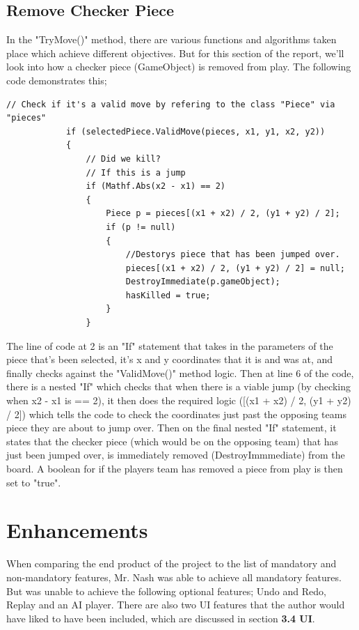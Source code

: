 \documentclass[10pt, a4paper]{article}
\begin{document}
	 \subsection{Remove Checker Piece}
	 In the "TryMove()" method, there are various functions and algorithms taken place which achieve different objectives. But for this section of the report, we'll look into how a checker piece (GameObject) is removed from play. The following code demonstrates this;
	 \begin{lstlisting}[caption = TryMove()]
	 // Check if it's a valid move by refering to the class "Piece" via "pieces"
            if (selectedPiece.ValidMove(pieces, x1, y1, x2, y2))
            {
                // Did we kill?
                // If this is a jump
                if (Mathf.Abs(x2 - x1) == 2)
                {
                    Piece p = pieces[(x1 + x2) / 2, (y1 + y2) / 2];
                    if (p != null)
                    {
                        //Destorys piece that has been jumped over.
                        pieces[(x1 + x2) / 2, (y1 + y2) / 2] = null;
                        DestroyImmediate(p.gameObject);
                        hasKilled = true;
                    }
                }
	 \end{lstlisting}
	 The line of code at 2 is an "If" statement that takes in the parameters of the piece that's been selected, it's x and y coordinates that it is and was at, and finally checks against the "ValidMove()" method logic. Then at line 6 of the code, there is a nested "If" which checks that when there is a viable jump (by checking when x2 - x1 is == 2), it then does the required logic ([(x1 + x2) / 2, (y1 + y2) / 2]) which tells the code to check the coordinates just past the opposing teams piece they are about to jump over. Then on the final nested "If" statement, it states that the checker piece (which would be on the opposing team) that has just been jumped over, is immediately removed (DestroyImmmediate) from the board. A boolean for if the players team has removed a piece from play is then set to "true".
	 
	 \section{Enhancements}
	 When comparing the end product of the project to the list of mandatory and non-mandatory features, Mr. Nash was able to achieve all mandatory features. But was unable to achieve the following optional features; Undo and Redo, Replay and an AI player. There are also two UI features that the author would have liked to have been included, which are discussed in section \textbf{3.4 UI}.
	 
\end{document}
